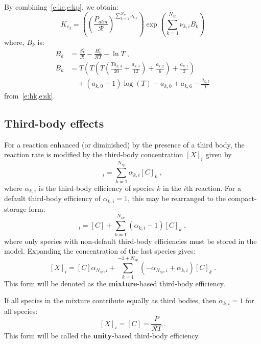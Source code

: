 \documentclass[12pt]{article}
\newcommand{\ns}{N_{sp}}
\newcommand{\Ru}{\mathcal{R}}
\begin{document}
By combining~\cref{e:kc,e:kp}, we obtain:
\begin{equation}
 \label{e:kc_in_kp}
 {K_c}_{i} = \left(\left(\frac{P_{atm}}{\Ru}\right)^{\sum_{k=1}^{\ns} \nu_{k,i}}\right) \operatorname{exp}\left({\sum_{k=1}^{\ns} \nu_{k,i} B_{k}}\right)
\end{equation}
where, $B_k$ is:
\begin{align}
 \label{e:Bk}
 B_{k} &= \frac{S^{\circ}_k}{\Ru} - \frac{H^{\circ}_k}{\Ru T} - \ln{T} \nonumber\; , \\
 B_{k} &= T \left(T \left(T \left(\frac{T a_{k,4}}{20} + \frac{a_{k,3}}{12}\right) + \frac{a_{k,2}}{6}\right) + \frac{a_{k,1}}{2}\right) \nonumber \\
       & \quad + \left(a_{k,0} - 1\right) \log{\left (T \right )} - a_{k,0} + a_{k,6} - \frac{a_{k,5}}{T}
\end{align}
from~\cref{e:hk,e:sk}.

\subsection{Third-body effects}
\label{s:thdbody}

For a reaction enhanced (or diminished) by the presence of a third body, the reaction rate is modified by the third-body concentration $[X]_i$ given by
\begin{equation}
[X]_{i} = \sum_{k=1}^{\ns} \alpha_{k,i} [C]_{k} \;,
\end{equation}
where $\alpha_{k,i}$ is the third-body efficiency of species $k$ in the $i$th reaction.
For a default third-body efficiency of $\alpha_{k,i} = 1$, this may be rearranged to the compact-storage form:
\begin{equation}
 [X]_{i} = [C] + \sum_{k=1}^{\ns} \left(\alpha_{k,i} - 1\right) [C]_{k} \;,
\end{equation}
where only species with non-default third-body efficiencies must be stored in the model.
Expanding the concentration of the last species gives:
\begin{equation}
\label{e:thd_mix}
 [X]_{i}=[C] \alpha_{\ns,i} + \sum_{k=1}^{-1 + \ns} \left(- \alpha_{\ns,i} + \alpha_{k,i}\right) [C]_{k}\;.
\end{equation}
This form will be denoted as the \textbf{mixture}-based third-body efficiency.

If all species in the mixture contribute equally as third bodies, then $\alpha_{k,i} = 1$ for all species:
\begin{equation}
\label{e:thd_unity}
 [X]_{i} = [C] = \frac{P}{\Ru T} \;.
\end{equation}
This form will be called the \textbf{unity}-based third-body efficiency.
\end{document}
